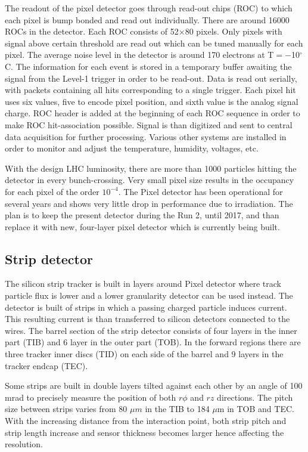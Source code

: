 \par The readout of the pixel detector goes through read-out chips (ROC) to which each pixel is bump bonded and read out individually. There are around 16000 ROCs in the detector. Each ROC consists of 52$\times$80 pixels. Only pixels with signal above certain threshold are read out which can be tuned manually for each pixel. The average noise level in the detector is around 170 electrons at T$=-$10$^\circ$C. The information for each event is stored in a temporary buffer awaiting the signal from the Level-1 trigger in order to be read-out. Data is read out serially, with packets containing all hits corresponding to a single trigger. Each pixel hit uses six values, five to encode pixel position, and sixth value is the analog signal charge. ROC header is added at the beginning of each ROC sequence in order to make ROC hit-association possible. Signal is than digitized and sent to central data acquisition for further processing. Various other systems are installed in order to monitor and adjust the temperature, humidity, voltages, etc. 
\par With the design LHC luminosity, there are more than 1000 particles hitting the detector in every bunch-crossing. Very small pixel size results in the occupancy for each pixel of the order $10^{-4}$. The Pixel detector has been operational for several years and shows very little drop in performance due to irradiation. The plan is to keep the present detector during the Run 2, until 2017, and than replace it with new, four-layer pixel detector which is currently being built.


\subsection{Strip detector}

The silicon strip tracker is built in layers around Pixel detector where track particle flux is lower and a lower granularity detector can be used instead. The detector is built of strips in which a passing charged particle induces current. This resulting current is than transferred to silicon detectors connected to the wires. The barrel section of the strip detector consists of four layers in the inner part (TIB) and 6 layer in the outer part (TOB). In the forward regions there are three tracker inner discs (TID) on each side of the barrel and 9 layers in the tracker endcap (TEC). 
\par Some strips are built in double layers tilted against each other by an angle of 100 mrad to precisely measure the position of both $r\phi$ and $rz$ directions. The pitch size between strips varies from 80 $\mu m$ in the TIB to 184 $\mu$m in TOB and TEC. With the increasing distance from the interaction point, both strip pitch and strip length increase and sensor thickness becomes larger hence affecting the resolution.    

